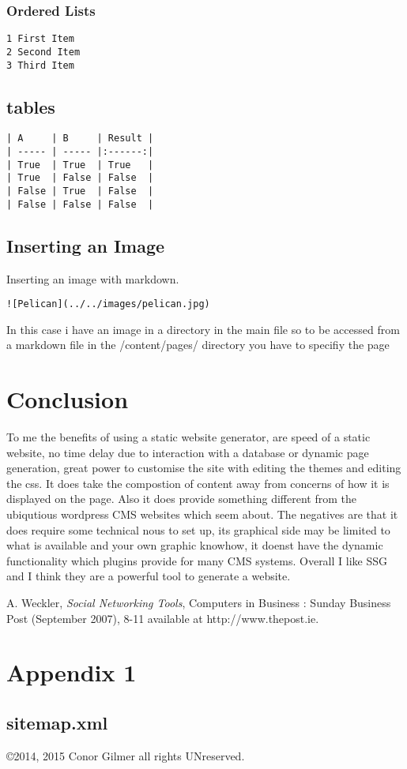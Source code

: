 \documentclass[12pt]{article}			%
\begin{document}
\subsubsection{Ordered Lists}
\begin{verbatim}
1 First Item
2 Second Item
3 Third Item
\end{verbatim}

\subsection{tables}

\begin{verbatim}
| A     | B     | Result |
| ----- | ----- |:------:|
| True  | True  | True   |
| True  | False | False  |
| False | True  | False  |
| False | False | False  |

\end{verbatim}
\subsection{Inserting an Image}
Inserting an image with markdown.
\begin{verbatim}
![Pelican](../../images/pelican.jpg)
\end{verbatim}
In this case i have an image in a directory in the main file so to be accessed from a markdown file in the /content/pages/ directory you have to specifiy the page


\newpage
\section{Conclusion}
To me the benefits of using a static website generator, are speed of a static website,
no time delay due to interaction with a database or dynamic page generation, great power to customise the site with editing the themes and editing the css. It does take the compostion of content away from concerns of how it is displayed on the page.
Also it does provide something different from the ubiqutious wordpress CMS websites which seem about.
The negatives are that it does require some technical nous to set up, its graphical side may be limited to what is available and your own graphic knowhow, it doenst have the dynamic functionality which plugins provide for many CMS systems.
Overall I like SSG and I think they are a powerful tool to generate a website.

\newpage
\begin{thebibliography}{9}

 A. Weckler, \emph{Social Networking Tools},  Computers in Business : Sunday Business Post (September 2007), 8-11 available at 
http://www.thepost.ie.

\end{thebibliography}



\newpage
\appendix
\section{Appendix 1}
\subsection{sitemap.xml}

\copyright 2014, 2015 Conor Gilmer  all rights UNreserved.
\end{document}

